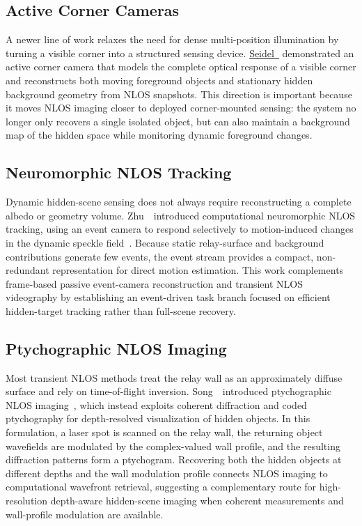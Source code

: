 \subsection{Active Corner Cameras}
A newer line of work relaxes the need for dense multi-position illumination by turning a visible corner into a structured sensing device. \href{https://www.nature.com/articles/s41467-023-39327-2}{Seidel~\etal} demonstrated an active corner camera that models the complete optical response of a visible corner and reconstructs both moving foreground objects and stationary hidden background geometry from NLOS snapshots. This direction is important because it moves NLOS imaging closer to deployed corner-mounted sensing: the system no longer only recovers a single isolated object, but can also maintain a background map of the hidden space while monitoring dynamic foreground changes.


\subsection{Neuromorphic NLOS Tracking}
Dynamic hidden-scene sensing does not always require reconstructing a complete albedo or geometry volume. Zhu~\etal~introduced computational neuromorphic NLOS tracking, using an event camera to respond selectively to motion-induced changes in the dynamic speckle field~\cite{zhuEfficientNeuromorphicNLOSTracking2024}. Because static relay-surface and background contributions generate few events, the event stream provides a compact, non-redundant representation for direct motion estimation. This work complements frame-based passive event-camera reconstruction and transient NLOS videography by establishing an event-driven task branch focused on efficient hidden-target tracking rather than full-scene recovery.

\subsection{Ptychographic NLOS Imaging}
Most transient NLOS methods treat the relay wall as an approximately diffuse surface and rely on time-of-flight inversion. Song~\etal~introduced ptychographic NLOS imaging~\cite{songPtychographicNLOS2024}, which instead exploits coherent diffraction and coded ptychography for depth-resolved visualization of hidden objects. In this formulation, a laser spot is scanned on the relay wall, the returning object wavefields are modulated by the complex-valued wall profile, and the resulting diffraction patterns form a ptychogram. Recovering both the hidden objects at different depths and the wall modulation profile connects NLOS imaging to computational wavefront retrieval, suggesting a complementary route for high-resolution depth-aware hidden-scene imaging when coherent measurements and wall-profile modulation are available.

